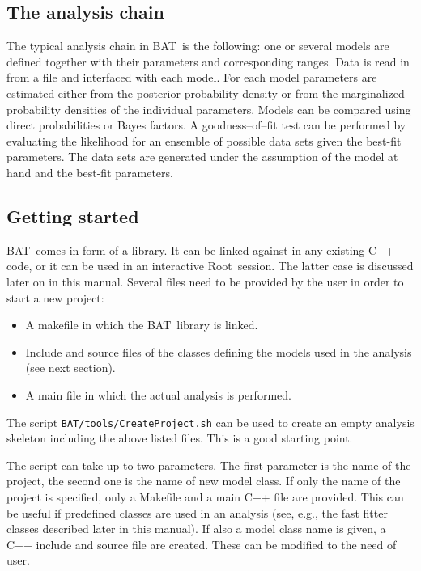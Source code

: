 \documentclass[11pt, a4paper]{article}
\newcommand{\bat}{{\sc BAT}}
\newcommand{\Root}{{\sc Root}}
\begin{document}
\subsection{The analysis chain}
\label{subsection:chain}

The typical analysis chain in \bat\ is the following: one or several
models are defined together with their parameters and corresponding
ranges. Data is read in from a file and interfaced with each
model. For each model parameters are estimated either from the
posterior probability density or from the marginalized probability
densities of the individual parameters. Models can be compared using
direct probabilities or Bayes factors. A goodness--of--fit test can be
performed by evaluating the likelihood for an ensemble of possible
data sets given the best-fit parameters. The data sets are generated
under the assumption of the model at hand and the best-fit
parameters.


\subsection{Getting started}
\label{subsection:start}

\bat\ comes in form of a library. It can be linked against in any
existing C++ code, or it can be used in an interactive
\Root\ session. The latter case is discussed later on in this
manual. Several files need to be provided by the user in order to
start a new project:
%
\begin{itemize}
\item A makefile in which the \bat\ library is linked.
\item Include and source files of the classes defining the models
used in the analysis (see next section).
\item A main file in which the actual analysis is performed.
\end{itemize}
%
The script \verb|BAT/tools/CreateProject.sh| can be used to create an
empty analysis skeleton including the above listed files. This is a
good starting point.

The script can take up to two parameters. The first parameter is the
name of the project, the second one is the name of new model class. If
only the name of the project is specified, only a Makefile and a main
C++ file are provided. This can be useful if predefined classes are
used in an analysis (see, e.g., the fast fitter classes described
later in this manual). If also a model class name is given, a C++
include and source file are created. These can be modified to the need
of user.
\end{document}
